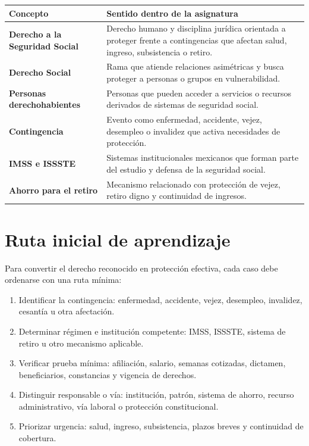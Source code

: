 \documentclass[
  spanish,
  letterpaper, oneside
]{article}
\begin{document}
\begin{longtable}{>{\bfseries}p{}p{}}
\toprule
Concepto & Sentido dentro de la asignatura \\
\midrule
Derecho a la Seguridad Social & Derecho humano y disciplina jurídica orientada a proteger frente a contingencias que afectan salud, ingreso, subsistencia o retiro. \\
Derecho Social & Rama que atiende relaciones asimétricas y busca proteger a personas o grupos en vulnerabilidad. \\
Personas derechohabientes & Personas que pueden acceder a servicios o recursos derivados de sistemas de seguridad social. \\
Contingencia & Evento como enfermedad, accidente, vejez, desempleo o invalidez que activa necesidades de protección. \\
IMSS e ISSSTE & Sistemas institucionales mexicanos que forman parte del estudio y defensa de la seguridad social. \\
Ahorro para el retiro & Mecanismo relacionado con protección de vejez, retiro digno y continuidad de ingresos. \\
\bottomrule
\end{longtable}

\section{Ruta inicial de aprendizaje}

Para convertir el derecho reconocido en protección efectiva, cada caso debe ordenarse con una ruta mínima:

\begin{enumerate}
  \item Identificar la contingencia: enfermedad, accidente, vejez, desempleo, invalidez, cesantía u otra afectación.
  \item Determinar régimen e institución competente: IMSS, ISSSTE, sistema de retiro u otro mecanismo aplicable.
  \item Verificar prueba mínima: afiliación, salario, semanas cotizadas, dictamen, beneficiarios, constancias y vigencia de derechos.
  \item Distinguir responsable o vía: institución, patrón, sistema de ahorro, recurso administrativo, vía laboral o protección constitucional.
  \item Priorizar urgencia: salud, ingreso, subsistencia, plazos breves y continuidad de cobertura.
\end{enumerate}
\end{document}
